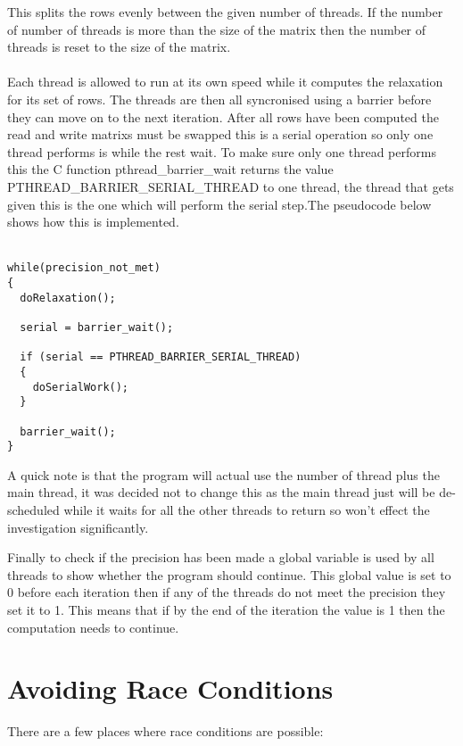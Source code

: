 \documentclass{article}
\begin{document}
This splits the rows evenly between the given number of threads. If the number of
number of threads is more than the size of the matrix then the number of threads
is reset to the size of the matrix.\\~\\
Each thread is allowed to run at its own speed while it computes the relaxation
for its set of rows. The threads are then all syncronised using a barrier before
they can move on to the next iteration. After all rows have been computed the
read and write matrixs must be swapped this is a serial operation so only one
thread performs is while the rest wait. To make sure only one thread performs this
the C function pthread\_barrier\_wait returns the value PTHREAD\_BARRIER\_SERIAL\_THREAD
to one thread, the thread that gets given this is the one which will perform the
serial step.The pseudocode below shows how this is implemented.\\~\\

\begin{lstlisting}
while(precision_not_met)
{
  doRelaxation();

  serial = barrier_wait();

  if (serial == PTHREAD_BARRIER_SERIAL_THREAD)
  {
    doSerialWork();
  }

  barrier_wait();
}
\end{lstlisting}


A quick note is that the program will actual use the number of thread plus the
main thread, it was decided not to change this as the main thread just will be
de-scheduled while it waits for all the other threads to return so won't effect
the investigation significantly.

Finally to check if the precision has been made a global variable is used by all
threads to show whether the program should continue. This global value is set to
0 before each iteration then if any of the threads do not meet the precision they
set it to 1. This means that if by the end of the iteration the value is 1 then
the computation needs to continue.

\newpage
\section{Avoiding Race Conditions}
There are a few places where race conditions are possible:
\end{document}

